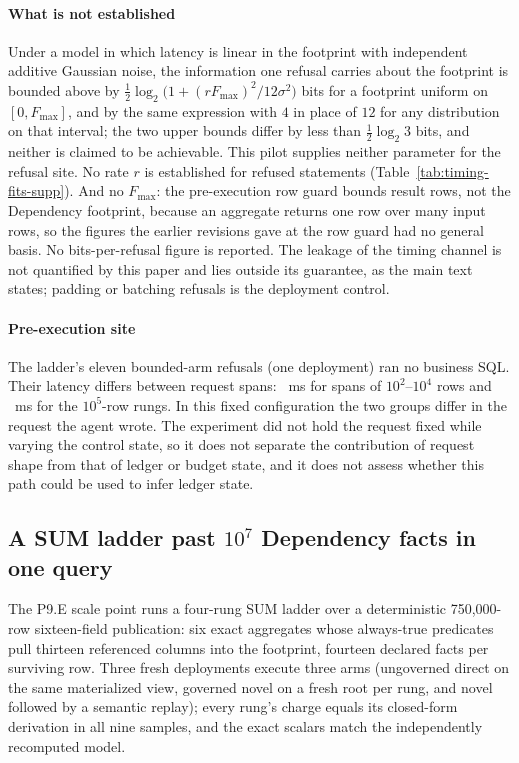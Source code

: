 \documentclass[journal,onecolumn]{IEEEtran}
\begin{document}
\paragraph{What is not established}
Under a model in which latency is linear in the footprint with independent
additive Gaussian noise, the information one refusal carries about the
footprint is bounded above by
$\tfrac12\log_2\!\bigl(1+(rF_{\max})^2/12\sigma^2\bigr)$ bits for a footprint
uniform on $[0,F_{\max}]$, and by the same expression with $4$ in place of
$12$ for any distribution on that interval; the two upper bounds differ by
less than $\tfrac12\log_2 3$ bits, and neither is claimed to be achievable.
This pilot supplies neither parameter for the refusal site. No rate $r$ is
established for refused statements (Table~\ref{tab:timing-fits-supp}). And
no $F_{\max}$: the pre-execution row guard bounds result rows, not the
Dependency footprint, because an aggregate returns one row over many input
rows, so the figures the earlier revisions gave at the row guard had no
general basis. No bits-per-refusal figure is reported. The leakage of the
timing channel is not quantified by this paper and lies outside its
guarantee, as the main text states; padding or batching refusals is the
deployment control.

\paragraph{Pre-execution site}
The ladder's eleven bounded-arm refusals (one deployment) ran no business
SQL. Their latency differs between request spans:
\TimingPreSmallSpanMS{}~ms for spans of $10^2$--$10^4$ rows and
\TimingPreLargeSpanMS{}~ms for the $10^5$-row rungs. In this fixed
configuration the two groups differ in the request the agent wrote. The
experiment did not hold the request fixed while varying the control state,
so it does not separate the contribution of request shape from that of
ledger or budget state, and it does not assess whether this path could be
used to infer ledger state.

\subsection{A SUM ladder past $10^7$ Dependency facts in one query}
\label{sec:scale7-supp}

The P9.E scale point runs a four-rung SUM ladder over a deterministic
750,000-row sixteen-field publication: six exact aggregates whose
always-true predicates pull thirteen referenced columns into the
footprint, fourteen declared facts per surviving row. Three fresh
deployments execute three arms (ungoverned direct on the same
materialized view, governed novel on a fresh root per rung, and novel
followed by a semantic replay); every rung's charge equals its
closed-form derivation in all nine samples, and the exact scalars match
the independently recomputed model.
\end{document}
